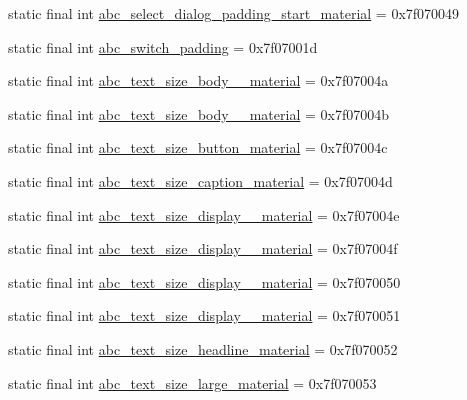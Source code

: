 \begin{CompactItemize}
static final int \hyperlink{classandroid_1_1support_1_1v7_1_1recyclerview_1_1_r_1_1dimen_1fcf9454c7283aab533937104a532484}{abc\_\-select\_\-dialog\_\-padding\_\-start\_\-material} = 0x7f070049
\item 
static final int \hyperlink{classandroid_1_1support_1_1v7_1_1recyclerview_1_1_r_1_1dimen_dc7d42c7555c550b681cd4b97b30a2dd}{abc\_\-switch\_\-padding} = 0x7f07001d
\item 
static final int \hyperlink{classandroid_1_1support_1_1v7_1_1recyclerview_1_1_r_1_1dimen_6a4dde6db8fe1d2c5beadbb3cf2e8fde}{abc\_\-text\_\-size\_\-body\_\_\-material} = 0x7f07004a
\item 
static final int \hyperlink{classandroid_1_1support_1_1v7_1_1recyclerview_1_1_r_1_1dimen_607201b58ed766af61b5f396264be314}{abc\_\-text\_\-size\_\-body\_\_\-material} = 0x7f07004b
\item 
static final int \hyperlink{classandroid_1_1support_1_1v7_1_1recyclerview_1_1_r_1_1dimen_cdc7d65011296ab703d69281c4e117cb}{abc\_\-text\_\-size\_\-button\_\-material} = 0x7f07004c
\item 
static final int \hyperlink{classandroid_1_1support_1_1v7_1_1recyclerview_1_1_r_1_1dimen_ce6b37f52fc05a5e41cdc12e9e8815cf}{abc\_\-text\_\-size\_\-caption\_\-material} = 0x7f07004d
\item 
static final int \hyperlink{classandroid_1_1support_1_1v7_1_1recyclerview_1_1_r_1_1dimen_473fe17f95568a9cca99391e04384cc1}{abc\_\-text\_\-size\_\-display\_\_\-material} = 0x7f07004e
\item 
static final int \hyperlink{classandroid_1_1support_1_1v7_1_1recyclerview_1_1_r_1_1dimen_06b666020f6f63591f6da3b28e611527}{abc\_\-text\_\-size\_\-display\_\_\-material} = 0x7f07004f
\item 
static final int \hyperlink{classandroid_1_1support_1_1v7_1_1recyclerview_1_1_r_1_1dimen_4b41643dd250b2ca7310e810f76f8b23}{abc\_\-text\_\-size\_\-display\_\_\-material} = 0x7f070050
\item 
static final int \hyperlink{classandroid_1_1support_1_1v7_1_1recyclerview_1_1_r_1_1dimen_0d51b77a37f8ec9879fb7894ba24fc24}{abc\_\-text\_\-size\_\-display\_\_\-material} = 0x7f070051
\item 
static final int \hyperlink{classandroid_1_1support_1_1v7_1_1recyclerview_1_1_r_1_1dimen_99a1495dcba429c263368feaf5f83b1f}{abc\_\-text\_\-size\_\-headline\_\-material} = 0x7f070052
\item 
static final int \hyperlink{classandroid_1_1support_1_1v7_1_1recyclerview_1_1_r_1_1dimen_2ca13fb6417cbd470011e13cf91ac8cb}{abc\_\-text\_\-size\_\-large\_\-material} = 0x7f070053

\end{CompactItemize}
